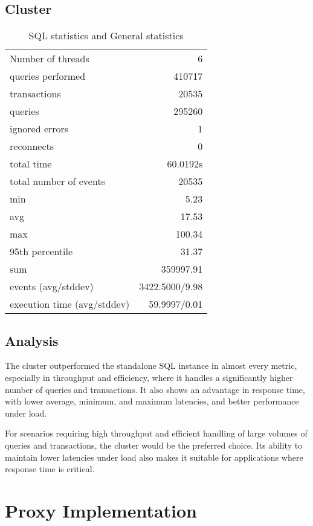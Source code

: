 \documentclass[11pt]{article}
\begin{document}
\subsection{Cluster}

\begin{table}[H]
\centering
\begin{tabular}{ l r }
\hline
Number of threads & 6 \\
queries performed & 410717 \\
transactions & 20535 \\
queries & 295260 \\
ignored errors & 1 \\
reconnects & 0 \\
total time & 60.0192s \\
total number of events & 20535 \\
min & 5.23 \\
avg & 17.53 \\
max & 100.34 \\
95th percentile & 31.37 \\
sum & 359997.91 \\
events (avg/stddev) & 3422.5000/9.98 \\
execution time (avg/stddev) & 59.9997/0.01 \\
\hline
\end{tabular}
\caption{SQL statistics and General statistics}
\label{tab:table1}
\end{table}

\subsection{Analysis}

The cluster outperformed the standalone SQL instance in almost every metric, especially in throughput and efficiency, where it handles a significantly higher number of queries and transactions. It also shows an advantage in response time, with lower average, minimum, and maximum latencies, and better performance under load.
\newline

For scenarios requiring high throughput and efficient handling of large volumes of queries and transactions, the cluster would be the preferred choice. Its ability to maintain lower latencies under load also makes it suitable for applications where response time is critical.

\section{Proxy Implementation}
\end{document}
